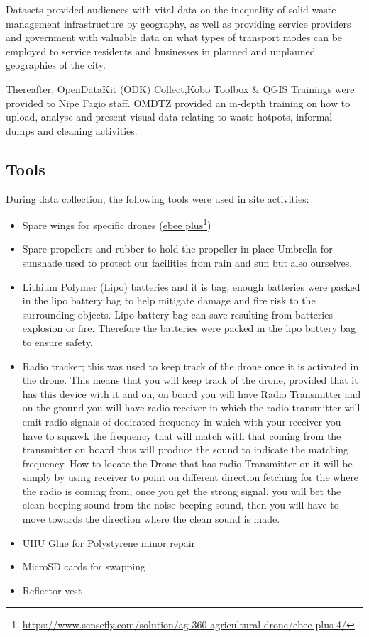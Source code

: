 \documentclass[a4paper,12pt,twoside]{article}
\begin{document}
    Datasets provided audiences with vital data on the inequality of solid waste management infrastructure by geography, as well as providing service providers and government with valuable data on what types of transport modes can be employed to service residents and businesses in planned and unplanned geographies of the city.

    Thereafter, OpenDataKit (ODK) Collect,Kobo Toolbox & QGIS Trainings were provided to Nipe Fagio staff. OMDTZ provided an in-depth training on how to upload, analyse and present visual data relating to waste hotpots, informal dumps and cleaning activities.

\subsection{Tools}

    During data collection, the following tools were used in site activities:
    \begin{itemize}
  
        \item Spare wings for specific drones (\href{https://www.sensefly.com/solution/ag-360-agricultural-drone/ebee-plus-4/}{ebee plus}\footnote{\url{https://www.sensefly.com/solution/ag-360-agricultural-drone/ebee-plus-4/}})
        \item Spare propellers and rubber to hold the propeller in place
        Umbrella for sunshade used to protect our facilities from rain and sun but also ourselves.
        \item Lithium Polymer (Lipo) batteries and it is bag; enough batteries were packed in the lipo battery bag to help mitigate damage and fire risk to the surrounding objects. Lipo battery bag can save resulting from batteries explosion or fire. Therefore the batteries were packed in the lipo battery bag to ensure safety. 
        \item Radio tracker; this was used to keep track of the drone once it is activated in the drone. This means that you will keep track of the drone, provided that it has this device with it and on, on board you will have Radio Transmitter and on the ground you will have radio receiver in which the radio transmitter will emit radio signals of dedicated frequency in which with your receiver you have to squawk the frequency that will match with that coming from the transmitter on board thus will produce the sound to indicate the matching frequency. How to locate the Drone that has radio Transmitter on it will be simply by using receiver to point on different direction fetching for the where the radio is coming from, once you get the strong signal, you will bet the clean beeping sound from the noise beeping sound, then you will have to move towards the direction where the clean sound is made.
        \item UHU Glue for Polystyrene minor repair
        \item MicroSD cards for swapping
        \item Reflector vest
    \end{itemize}
\end{document}
